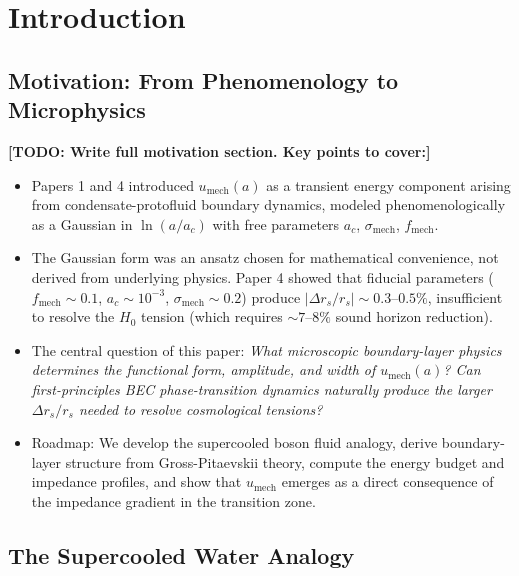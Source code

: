 \documentclass[11pt,a4paper]{article}
\newcommand{\umech}{\ensuremath{u_{\mathrm{mech}}}}
\newcommand{\fmech}{\ensuremath{f_{\mathrm{mech}}}}
\newcommand{\ac}{\ensuremath{a_c}}
\newcommand{\sigmamech}{\ensuremath{\sigma_{\mathrm{mech}}}}
\newcommand{\rs}{\ensuremath{r_s}}
\theoremstyle{definition}
\theoremstyle{remark}
\begin{document}
\tableofcontents
\newpage

\section{Introduction}
\label{sec:introduction}

\subsection{Motivation: From Phenomenology to Microphysics}
\label{sec:motivation}

\textbf{[TODO: Write full motivation section. Key points to cover:]}

\begin{itemize}[leftmargin=*, itemsep=0.3em]
\item Papers 1 and 4 introduced $\umech(a)$ as a transient energy component arising from condensate-protofluid boundary dynamics, modeled phenomenologically as a Gaussian in $\ln(a/\ac)$ with free parameters $\ac$, $\sigmamech$, $\fmech$.
\item The Gaussian form was an ansatz chosen for mathematical convenience, not derived from underlying physics. Paper 4 showed that fiducial parameters ($\fmech \sim 0.1$, $\ac \sim 10^{-3}$, $\sigmamech \sim 0.2$) produce $|\Delta\rs/\rs| \sim 0.3$--$0.5\%$, insufficient to resolve the $H_0$ tension (which requires $\sim 7$--$8\%$ sound horizon reduction).
\item The central question of this paper: \emph{What microscopic boundary-layer physics determines the functional form, amplitude, and width of $\umech(a)$? Can first-principles BEC phase-transition dynamics naturally produce the larger $\Delta\rs/\rs$ needed to resolve cosmological tensions?}
\item Roadmap: We develop the supercooled boson fluid analogy, derive boundary-layer structure from Gross-Pitaevskii theory, compute the energy budget and impedance profiles, and show that $\umech$ emerges as a direct consequence of the impedance gradient in the transition zone.
\end{itemize}

\subsection{The Supercooled Water Analogy}
\label{sec:analogy}
\end{document}
